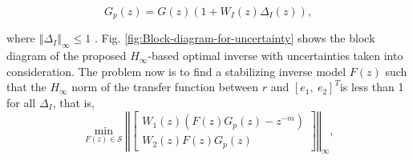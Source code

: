 \documentclass [11pt, proquest] {uwthesis}[2020/02/24]
\begin{document}
\begin{equation}
G_{p}(z)=G(z)(1+W_{I}(z)\Delta_{I}(z)),\label{eq:uncertainty}
\end{equation}

\noindent where $\left\Vert \Delta_{I}\right\Vert _{\infty}\leq1$
\cite{skogestad2007multivariable}. Fig. \ref{fig:Block-diagram-for-uncertainty}
shows the block diagram of the proposed $H_{\infty}$-based optimal
inverse with uncertainties taken into consideration. The problem now
is to find a stabilizing inverse model $F(z)$ such that the $H_{\infty}$
norm of the transfer function between $r$ and $[e_{1},\:e_{2}]^{T}$is
less than 1 for all $\Delta_{I}$, that is,
\begin{equation}
\min_{F(z)\in\mathcal{S}}\left\Vert \left[\begin{array}{c}
W_{1}(z)(F(z)G_{p}(z)-z^{-m})\\
W_{2}(z)F(z)G_{p}(z)
\end{array}\right]\right\Vert _{\infty},\label{eq:hinf-2-1}
\end{equation}
\end{document}
